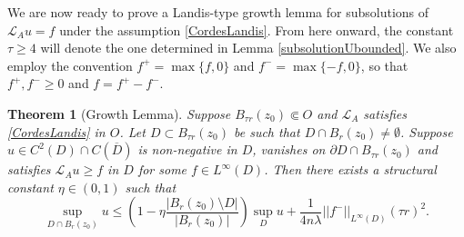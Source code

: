 \documentclass[12pt]{amsart}
\newtheorem{Theorem}{Theorem}[section]
\def \L {\mathcal{L}}
\def \t {\tau}
\begin{document}
We are now ready to prove a Landis-type growth lemma for subsolutions of $\L_A u = f$ under the assumption \eqref{CordesLandis}. From here onward, the constant $\t\geq 4$ will denote the one determined in Lemma \ref{subsolutionUbounded}. We also employ the convention $f^+=\max\{f,0\}$ and $f^-=\max\{-f,0\}$, so that $f^+,f^-\geq0$ and $f=f^+-f^-$.

\begin{Theorem}[Growth Lemma]\label{growthlemmalandisH} Suppose $B_{\t r}(z_0) \Subset O$ and $\L_A$ satisfies \eqref{CordesLandis} in $O$. Let $D \subset B_{\t r}(z_0)$ be such that $D \cap B_{r}(z_0) \neq \emptyset$. Suppose $u \in C^2(D) \cap C(\overline{D})$ is non-negative in $D$, vanishes on $\partial D \cap B_{\t r}(z_0)$ and satisfies $\L_A u \geq f$ in $D$ for some $f \in L^{\infty}(D)$. Then there exists a structural constant $\eta \in (0,1)$ such that
$$\sup_{D \cap B_r(z_0)} u\leq \left(1 - \eta \frac{|B_r(z_0) \setminus D|}{|B_r(z_0)|} \right) \sup_D u +
\frac{1}{4n\lambda} ||f^-||_{L^{\infty}(D)} (\tau r)^2.$$
\end{Theorem}
\end{document}
